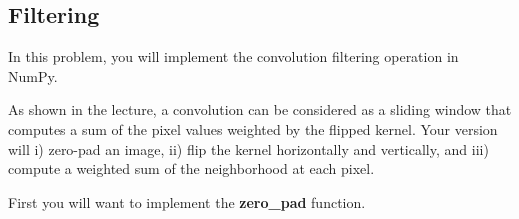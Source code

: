 \documentclass[11pt]{article}
\begin{document}
    \begin{center}
    \end{center}
    { \hspace*{\fill} \\}
    
    \begin{center}
    \end{center}
    { \hspace*{\fill} \\}
    
    \begin{center}
    \end{center}
    { \hspace*{\fill} \\}
    
    \begin{center}
    \end{center}
    { \hspace*{\fill} \\}
    
    \begin{center}
    \end{center}
    { \hspace*{\fill} \\}
    
    \subsection{Filtering}\label{filtering}

In this problem, you will implement the convolution filtering operation
in NumPy.

As shown in the lecture, a convolution can be considered as a sliding
window that computes a sum of the pixel values weighted by the flipped
kernel. Your version will i) zero-pad an image, ii) flip the kernel
horizontally and vertically, and iii) compute a weighted sum of the
neighborhood at each pixel.

First you will want to implement the \textbf{zero\_pad} function.
\end{document}
